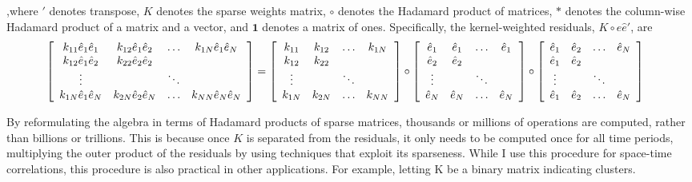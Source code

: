 ,where $'$ denotes transpose, $K$ denotes the sparse weights matrix, $\circ$ denotes the Hadamard product of matrices, $*$ denotes the column-wise Hadamard product of a matrix and a vector, and $\mathbf{1}$ denotes a matrix of ones. Specifically, the kernel-weighted residuals, $K \circ \hat{e} \hat{e}'$, are 
\begin{eqnarray*}
\hspace*{-1em}
\left[\begin{array}{cccc}
k_{11}\hat{e}_{1}\hat{e}_{1} & k_{12}\hat{e}_{1}\hat{e}_{2} & \hdots & k_{1N}\hat{e}_{1}\hat{e}_{N}  \\
k_{12}\hat{e}_{1}\hat{e}_{2} & k_{22}\hat{e}_{2}\hat{e}_{2} &	     & 		     					\\
\vdots						 &   				  			& \ddots &  	        					\\
k_{1N}\hat{e}_{1}\hat{e}_{N} & k_{2N}\hat{e}_{2}\hat{e}_{N} & \hdots & k_{NN}\hat{e}_{N}\hat{e}_{N}
\end{array}\right] 
=
\left[\begin{array}{cccc}
k_{11} & k_{12} & \hdots  & k_{1N}  \\
k_{12} & k_{22} & 	      & 		\\
\vdots	&   	& \ddots  &	 	\\
k_{1N} & k_{2N} & \hdots  & k_{NN}
\end{array}\right]
\circ
\left[\begin{array}{cccc}
\hat{e}_{1} & \hat{e}_{1} & \hdots  & \hat{e}_{1}  \\
\hat{e}_{2} & \hat{e}_{2} & 	    & 		       \\
\vdots		&   		  & \ddots  &  	           \\
\hat{e}_{N} & \hat{e}_{N} & \hdots  & \hat{e}_{N}
\end{array}\right]
\circ
\left[\begin{array}{cccc}
\hat{e}_{1} & \hat{e}_{2} & \hdots  & \hat{e}_{N} \\
\hat{e}_{1} & \hat{e}_{2} & 	    &			  \\
\vdots      &			  & \ddots  &			  \\
\hat{e}_{1} & \hat{e}_{2} & \hdots  & \hat{e}_{N}
\end{array}\right]
\end{eqnarray*}


By reformulating the algebra in terms of Hadamard products of sparse matrices, thousands or millions of operations are computed, rather than billions or trillions. This is because once $K$ is separated from the residuals, it only needs to be computed once for all time periods, multiplying the outer product of the residuals by using techniques that exploit its sparseness. While I use this procedure for space-time correlations, this procedure is also practical in other applications. For example, letting K be a binary matrix indicating clusters.

